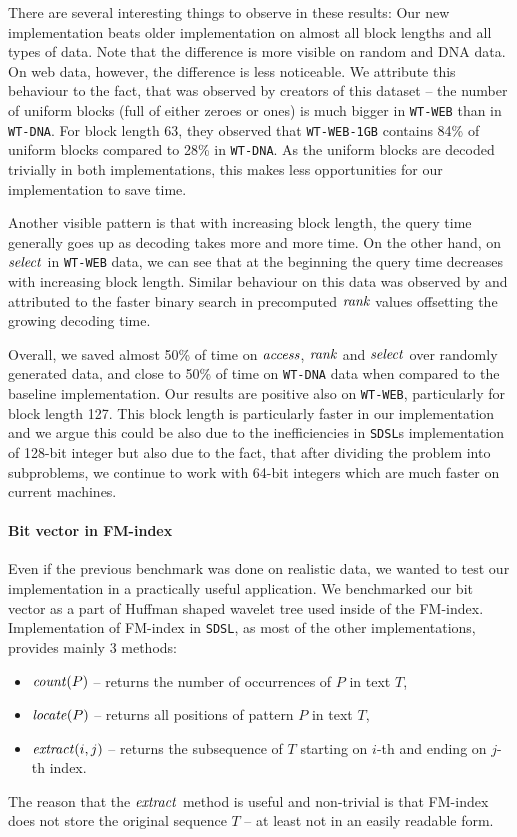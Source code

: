 There are several interesting things to observe in these results: Our new implementation
beats older implementation on almost all block lengths and all types of data. Note that the difference is more
visible on random and DNA data. On web data, however, the difference is less noticeable. We attribute
this behaviour to the fact, that was observed by creators of this dataset -- the number of
uniform blocks (full of either zeroes or ones) is much bigger in \texttt{WT-WEB} than in \texttt{WT-DNA}.
For block length 63, they observed that \texttt{WT-WEB-1GB} contains 84\% of uniform blocks compared to 28\% in
\texttt{WT-DNA}. As the uniform blocks are decoded trivially in both implementations, this makes less opportunities
for our implementation to save time.

Another visible pattern is that with increasing block length, the query time generally goes up as decoding takes
more and more time. On the other hand, on $\mathit{select}$ in \texttt{WT-WEB} data, we can see that at the beginning
the query time decreases with increasing block length. Similar behaviour on this data was observed by
\cite{gog2014optimized} and attributed to the faster binary search in precomputed $\mathit{rank}$ values offsetting the
growing decoding time.

Overall, we saved almost 50\% of time on $\mathit{access}$, $\mathit{rank}$ and $\mathit{select}$ over randomly generated data,
and close to 50\% of time on \texttt{WT-DNA} data when compared to the baseline implementation. Our results
are positive also on \texttt{WT-WEB}, particularly for block length 127. This block length is particularly
faster in our implementation and we argue this could be also due to the inefficiencies in \texttt{SDSL}s
implementation of 128-bit integer but also due to the fact, that after dividing the problem into subproblems,
we continue to work with 64-bit integers which are much faster on current machines.

\paragraph{Bit vector in FM-index}

Even if the previous benchmark was done on realistic data, we wanted to test our implementation in
a practically useful application. We benchmarked our bit vector as a part of Huffman shaped
wavelet tree used inside of the FM-index. Implementation of FM-index in \texttt{SDSL}, as most
of the other implementations, provides mainly 3 methods:
\begin{itemize}
	\item $\mathit{count}(P)$ -- returns the number of occurrences of $P$ in text $T$,
	\item $\mathit{locate}(P)$ -- returns all positions of pattern $P$ in text $T$,
	\item $\mathit{extract}(i, j)$ -- returns the subsequence of $T$ starting on $i$-th and ending on $j$-th index.
\end{itemize}
The reason that the $\mathit{extract}$ method is useful and non-trivial is that FM-index
does not store the original sequence $T$ -- at least not in an easily readable form.

